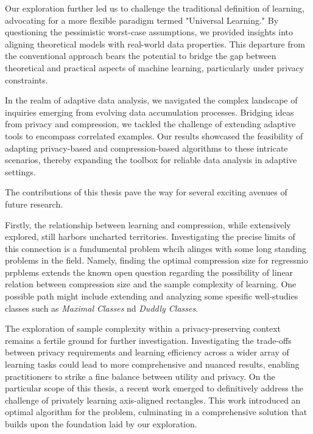 Our exploration further led us to challenge the traditional definition of learning, advocating for a more flexible paradigm termed "Universal Learning." By questioning the pessimistic worst-case assumptions, we provided insights into aligning theoretical models with real-world data properties. This departure from the conventional approach bears the potential to bridge the gap between theoretical and practical aspects of machine learning, particularly under privacy constraints.

In the realm of adaptive data analysis, we navigated the complex landscape of inquiries emerging from evolving data accumulation processes. Bridging ideas from privacy and compression, we tackled the challenge of extending adaptive tools to encompass correlated examples. Our results showcased the feasibility of adapting privacy-based and compression-based algorithms to these intricate scenarios, thereby expanding the toolbox for reliable data analysis in adaptive settings.

\label{sec:conclusion:future}

The contributions of this thesis pave the way for several exciting avenues of future research.

Firstly, the relationship between learning and compression, while extensively explored, still harbors uncharted territories. Investigating the precise limits of this connection is a fundumental problem whcih alinges with some long standing problems in the field. Namely, finding the optimal compression size for regressnio prpblems extends the known open question regarding the possibility of linear relation between compression size and the sample complexity of learning. One possible path might include extending and analyzing some spesific well-studies classes such as \emph{Maximal Classes} nd \emph{Duddly Classes}.

The exploration of sample complexity within a privacy-preserving context remains a fertile ground for further investigation. Investigating the trade-offs between privacy requirements and learning efficiency across a wider array of learning tasks could lead to more comprehensive and nuanced results, enabling practitioners to strike a fine balance between utility and privacy. On the particular scope of this thesis, a recent work emerged to definitively address the challenge of privately learning axis-aligned rectangles. This work introduced an optimal algorithm for the problem, culminating in a comprehensive solution that builds upon the foundation laid by our exploration.

